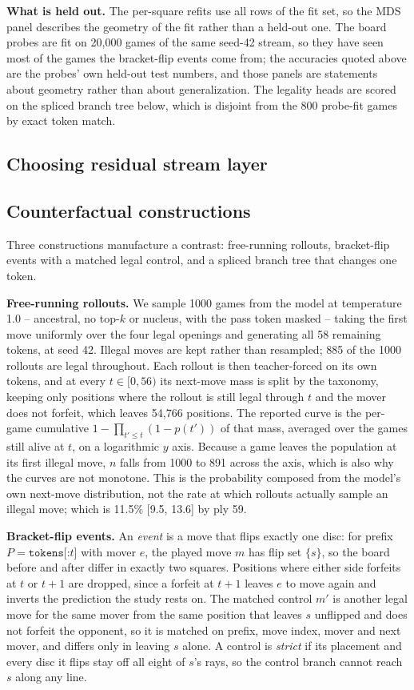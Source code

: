 \textbf{What is held out.} The per-square refits use all rows of the fit set, so the MDS panel
describes the geometry of the fit rather than a held-out one. The board probes are fit on 20,000
games of the same seed-42 stream, so they have seen most of the games the bracket-flip events
come from; the accuracies quoted above are the probes' own held-out test numbers, and those
panels are statements about geometry rather than about generalization. The legality heads are
scored on the spliced branch tree below, which is disjoint from the 800 probe-fit games by exact
token match.

\subsection{Choosing residual stream layer}

\subsection{Counterfactual constructions}

Three constructions manufacture a contrast: free-running rollouts, bracket-flip events with a
matched legal control, and a spliced branch tree that changes one token.

\textbf{Free-running rollouts.} We sample 1000 games from the model at temperature 1.0 --
ancestral, no top-$k$ or nucleus, with the pass token masked -- taking the first move uniformly
over the four legal openings and generating all 58 remaining tokens, at seed 42. Illegal moves
are kept rather than resampled; 885 of the 1000 rollouts are legal throughout. Each rollout is
then teacher-forced on its own tokens, and at every $t \in [0, 56)$ its next-move mass is split
by the taxonomy, keeping only positions where the rollout is still legal through $t$ and the
mover does not forfeit, which leaves 54,766 positions. The reported curve is the per-game
cumulative $1 - \prod_{t' \le t}(1 - p(t'))$ of that mass, averaged over the games still alive at
$t$, on a logarithmic $y$ axis. Because a game leaves the population at its first illegal move,
$n$ falls from 1000 to 891 across the axis, which is also why the curves are not monotone. This
is the probability composed from the model's own next-move distribution, not the rate at which
rollouts actually sample an illegal move; which is 11.5\% [9.5, 13.6] by ply 59.

\textbf{Bracket-flip events.} An \emph{event} is a move that flips exactly one disc: for prefix
$P = \texttt{tokens[:}t \texttt{]}$ with mover $e$, the played move $m$ has flip set $\{s\}$, so
the board before and after differ in exactly two squares. Positions where either side forfeits at
$t$ or $t+1$ are dropped, since a forfeit at $t+1$ leaves $e$ to move again and inverts the
prediction the study rests on. The matched control $m'$ is another legal move for the same mover
from the same position that leaves $s$ unflipped and does not forfeit the opponent, so it is
matched on prefix, move index, mover and next mover, and differs only in leaving $s$ alone. A
control is \emph{strict} if its placement and every disc it flips stay off all eight of $s$'s
rays, so the control branch cannot reach $s$ along any line.

